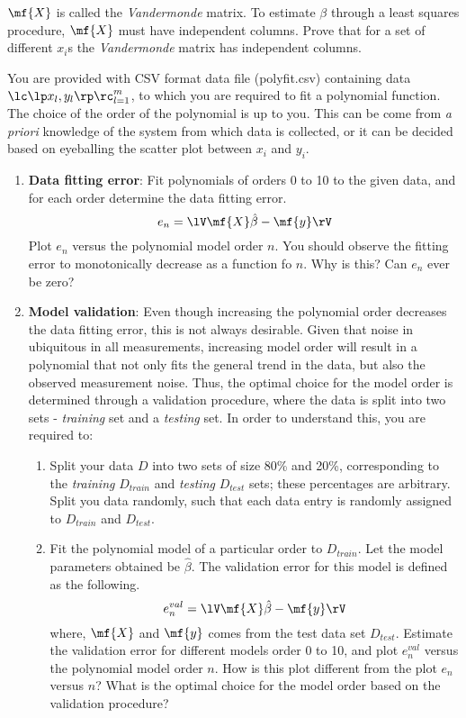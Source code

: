 \begin{enumerate}[resume]
    $\mf{X}$ is called the \textit{Vandermonde} matrix. To estimate $\beta$ through a least squares procedure, $\mf{X}$ must have independent columns. Prove that for a set of different $x_i$s the \textit{Vandermonde} matrix has independent columns.

    You are provided with CSV format data file (polyfit.csv) containing data $\lc\lp x_l, y_l \rp\rc_{l=1}^{m}$, to which you are required to fit a polynomial function. The choice of the order of the polynomial is up to you. This can be come from \textit{a priori} knowledge of the system from which data is collected, or it can be decided based on eyeballing the scatter plot between $x_i$ and $y_i$. 

    \begin{enumerate}
        \item \textbf{Data fitting error}: Fit polynomials of orders 0 to 10 to the given data, and for each order determine the data fitting error.
        \[ e_n = \lV\mf{X}\hat{\beta} - \mf{y}\rV \]
        Plot $e_n$ versus the polynomial model order $n$. You should observe the fitting error to monotonically decrease as a function fo $n$. Why is this? Can $e_n$ ever be zero?

        \item \textbf{Model validation}: Even though increasing the polynomial order decreases the data fitting error, this is not always desirable. Given that noise in ubiquitous in all measurements, increasing model order will result in a polynomial that not only fits the general trend in the data, but also the observed measurement noise. Thus, the optimal choice for the model order is determined through a validation procedure, where the data is split into two sets - \textit{training} set and a \textit{testing} set. In order to understand this, you are required to:
        \begin{enumerate}
            \item Split your data $D$ into two sets of size 80\% and 20\%, corresponding to the \textit{training} $D_{train}$ and \textit{testing} $D_{test}$ sets; these percentages are arbitrary. Split you data randomly, such that each data entry is randomly assigned to $D_{train}$ and $D_{test}$.

            \item Fit the polynomial model of a particular order to $D_{train}$. Let the model parameters obtained be $\hat{\beta}$. The validation error for this model is defined as the following.
            \[ e_n^{val} = \lV\mf{X}\hat{\beta} - \mf{y}\rV \]
            where, $\mf{X}$ and $\mf{y}$ comes from the test data set $D_{test}$. Estimate the validation error for different models order 0 to 10, and plot $e_n^{val}$ versus the polynomial model order $n$. How is this plot different from the plot $e_n$ versus $n$? What is the optimal choice for the model order based on the validation procedure?
        \end{enumerate}


\end{enumerate}
\end{enumerate}
